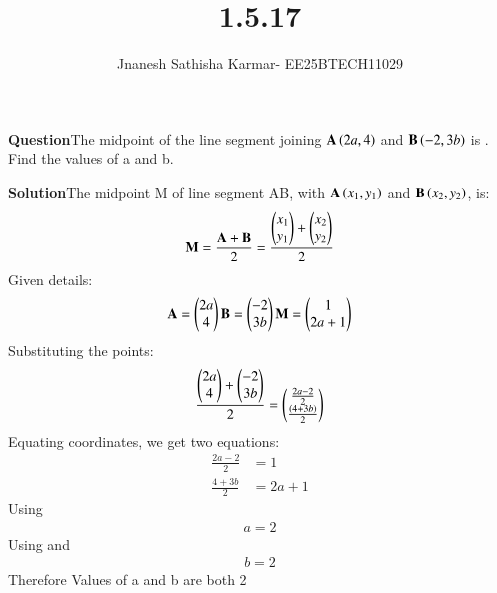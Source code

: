 \documentclass[journal]{IEEEtran}
\theoremstyle{remark}
\begin{document}

\onecolumn

\title{1.5.17}
\author{Jnanesh Sathisha Karmar- EE25BTECH11029}
\maketitle


\renewcommand{\thefigure}{\theenumi}
\renewcommand{\thetable}{\theenumi}
\textbf{Question}The midpoint of the line segment joining $\mathbf{A}\left(2a, 4\right)$ and $\mathbf{B}\left(-2, 3b\right)$ is . Find
the values of a and b.

\textbf{Solution}The midpoint M of line segment AB, with $\mathbf{A}\left(x_1, y_1\right)$ and $\mathbf{B}\left(x_2, y_2\right)$, is:
\begin{align}
	\mathbf{M}=\frac{\mathbf{A}+\mathbf{B}}{2}=\frac{\begin{pmatrix}x_1\\y_1\end{pmatrix} + \begin{pmatrix}x_2\\y_2\end{pmatrix}}{2}
\end{align}
Given details:
\begin{align}
    \mathbf{A}=\begin{pmatrix}2a\\4\end{pmatrix}  \mathbf{B}=\begin{pmatrix}-2\\3b\end{pmatrix} \mathbf{M}=\begin{pmatrix}1\\2a+1\end{pmatrix}
\end{align}
Substituting the points:
\begin{align}
\frac{\begin{pmatrix}2a\\4\end{pmatrix} + \begin{pmatrix}-2\\3b\end{pmatrix}}{2}=\begin{pmatrix}\frac{2a-2}{2}\\ \frac{\left(4+3b\right)}{2}\end{pmatrix}
\end{align}
Equating coordinates, we get two equations:
\begin{align}
\frac{2a - 2}{2} &= 1 \\
\frac{4 + 3b}{2} &= 2a + 1
\end{align}
Using  
\begin{align}
    a=2
\end{align}
Using  and 
\begin{align}
    b=2
\end{align}
Therefore Values of a and b are both 2
\end{document}

